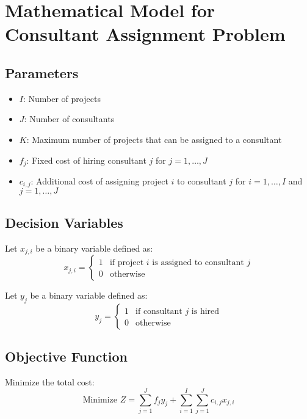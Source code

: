 \documentclass{article}
\begin{document}
\section*{Mathematical Model for Consultant Assignment Problem}

\subsection*{Parameters}
\begin{itemize}
    \item $I$: Number of projects
    \item $J$: Number of consultants
    \item $K$: Maximum number of projects that can be assigned to a consultant
    \item $f_j$: Fixed cost of hiring consultant $j$ for $j = 1, \ldots, J$
    \item $c_{i,j}$: Additional cost of assigning project $i$ to consultant $j$ for $i = 1, \ldots, I$ and $j = 1, \ldots, J$
\end{itemize}

\subsection*{Decision Variables}
Let $x_{j,i}$ be a binary variable defined as:
\[
x_{j,i} = 
\begin{cases}
1 & \text{if project } i \text{ is assigned to consultant } j \\
0 & \text{otherwise}
\end{cases}
\]

Let $y_j$ be a binary variable defined as:
\[
y_j = 
\begin{cases}
1 & \text{if consultant } j \text{ is hired} \\
0 & \text{otherwise}
\end{cases}
\]

\subsection*{Objective Function}
Minimize the total cost:
\[
\text{Minimize } Z = \sum_{j=1}^{J} f_j y_j + \sum_{i=1}^{I} \sum_{j=1}^{J} c_{i,j} x_{j,i}
\]
\end{document}

